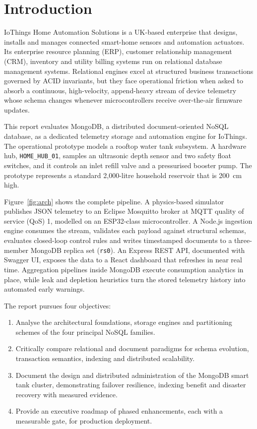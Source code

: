 \documentclass[11pt,a4paper]{article}
\begin{document}
\section{Introduction}

IoThings Home Automation Solutions is a UK-based enterprise that designs, installs and manages connected smart-home sensors and automation actuators. Its enterprise resource planning (ERP), customer relationship management (CRM), inventory and utility billing systems run on relational database management systems. Relational engines excel at structured business transactions governed by ACID invariants, but they face operational friction when asked to absorb a continuous, high-velocity, append-heavy stream of device telemetry whose schema changes whenever microcontrollers receive over-the-air firmware updates.

This report evaluates MongoDB, a distributed document-oriented NoSQL database, as a dedicated telemetry storage and automation engine for IoThings. The operational prototype models a rooftop water tank subsystem. A hardware hub, \texttt{HOME\_HUB\_01}, samples an ultrasonic depth sensor and two safety float switches, and it controls an inlet refill valve and a pressurised booster pump. The prototype represents a standard 2,000-litre household reservoir that is 200~cm high.

Figure~\ref{fig:arch} shows the complete pipeline. A physics-based simulator publishes JSON telemetry to an Eclipse Mosquitto broker at MQTT quality of service (QoS) 1, modelled on an ESP32-class microcontroller. A Node.js ingestion engine consumes the stream, validates each payload against structural schemas, evaluates closed-loop control rules and writes timestamped documents to a three-member MongoDB replica set (\texttt{rs0}). An Express REST API, documented with Swagger UI, exposes the data to a React dashboard that refreshes in near real time. Aggregation pipelines inside MongoDB execute consumption analytics in place, while leak and depletion heuristics turn the stored telemetry history into automated early warnings.

The report pursues four objectives:
\begin{enumerate}[noitemsep]
\item Analyse the architectural foundations, storage engines and partitioning schemes of the four principal NoSQL families.
\item Critically compare relational and document paradigms for schema evolution, transaction semantics, indexing and distributed scalability.
\item Document the design and distributed administration of the MongoDB smart tank cluster, demonstrating failover resilience, indexing benefit and disaster recovery with measured evidence.
\item Provide an executive roadmap of phased enhancements, each with a measurable gate, for production deployment.
\end{enumerate}
\end{document}
